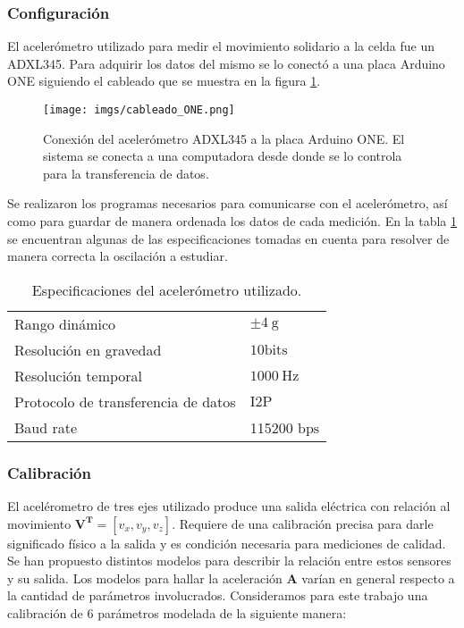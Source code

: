 \documentclass[../main.tex]{subfiles}
\begin{document}
\subsubsection{Configuración}
El acelerómetro utilizado para medir el movimiento solidario a la celda fue un ADXL345. Para adquirir los datos del mismo se lo conectó a una placa Arduino ONE siguiendo el cableado que se muestra en la figura \ref{fig:cableado}. 

\begin{figure}[H]
    \centering
    \texttt{[image: imgs/cableado\_ONE.png]}
    \caption{Conexión del acelerómetro ADXL345 a la placa Arduino ONE. El sistema se conecta a una computadora desde donde se lo controla para la transferencia de datos.}
    \label{fig:cableado}
\end{figure}


Se realizaron los programas necesarios para comunicarse con el acelerómetro, así como para guardar de manera ordenada los datos de cada medición. En la tabla \ref{tab:acelerometro} se encuentran algunas de las especificaciones tomadas en cuenta para resolver de manera correcta la oscilación a estudiar. 

\begin{table}[H]
\centering
\begin{tabular}{l|l}  
Rango dinámico & $\pm 4 \mathrm{~g}$ \\ Resolución en gravedad & $10 \mathrm{bits}$\\
Resolución temporal & $1000 \mathrm{~Hz}$ \\ Protocolo de transferencia de datos & $\mathrm{I2P}$ \\
Baud rate & 115200 $\mathrm{bps}$
\end{tabular}
\caption{Especificaciones del acelerómetro utilizado.}
\label{tab:acelerometro}
\end{table}

\subsubsection{Calibración}
El acelérometro de tres ejes utilizado produce una salida eléctrica con relación al movimiento $\mathbf{V^T} = [v_x, v_y, v_z]$. Requiere de una calibración precisa para darle significado físico a la salida y es condición necesaria para mediciones de calidad. 
Se han propuesto distintos modelos para describir la relación entre estos sensores y su salida. Los modelos para hallar la aceleración $\mathbf{A}$ varían en general respecto a la cantidad de parámetros involucrados. Consideramos para este trabajo una calibración de 6 parámetros modelada de la siguiente manera: 
\end{document}
